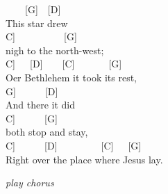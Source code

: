 \documentclass[
  letterpaper,
  a5paper]{memoir}
\begin{document}
~~~~{[}G{]}~~{[}D{]}\\
This star drew\\
\hspace*{0.333em}\hspace*{0.333em}\hspace*{0.333em}\hspace*{0.333em}{[}C{]}~~~~~~~~~~{[}G{]}\\
nigh to the north-west;\\
\hspace*{0.333em}\hspace*{0.333em}\hspace*{0.333em}\hspace*{0.333em}{[}C{]}~~~{[}D{]}~~~~{[}C{]}~~~~~~~{[}G{]}\\
O\textquotesingle er Bethlehem it took it\textquotesingle s rest,\\
\hspace*{0.333em}\hspace*{0.333em}\hspace*{0.333em}{[}G{]}~~~~~~{[}D{]}\\
And there it did\\
\hspace*{0.333em}\hspace*{0.333em}\hspace*{0.333em}\hspace*{0.333em}{[}C{]}~~~~~~{[}G{]}\\
both stop and stay,\\
\hspace*{0.333em}\hspace*{0.333em}\hspace*{0.333em}\hspace*{0.333em}\hspace*{0.333em}{[}C{]}~~~~~~{[}D{]}~~~~~~~~~{[}C{]}~~~{[}G{]}\\
Right over the place where Jesus lay.

\emph{play chorus}
\end{document}
